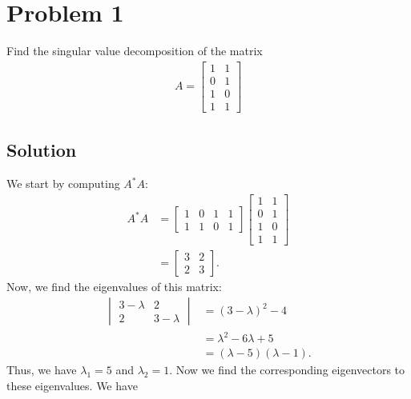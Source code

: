 \documentclass[10pt,a4paper]{article}
\author{Jeremiah Givens}
\theoremstyle{definition}
\begin{document}
\section*{Problem 1}
Find the singular value decomposition of the matrix
\begin{align*}
A = \begin{bmatrix}
1 & 1\\
0 & 1\\
1 & 0\\
1 & 1
\end{bmatrix}
\end{align*}

\subsection*{Solution}
We start by computing $A^*A$:
\begin{align*}
A^*A &= \begin{bmatrix}
1 & 0 & 1 & 1\\
1 & 1 & 0 & 1
\end{bmatrix} \begin{bmatrix}
1 & 1\\
0 & 1\\
1 & 0\\
1 & 1
\end{bmatrix}\\
&= \begin{bmatrix}
3 & 2\\
2 & 3
\end{bmatrix}.
\end{align*}
Now, we find the eigenvalues of this matrix:
\begin{align*}
\begin{vmatrix}
3 - \lambda & 2\\
2 & 3 - \lambda
\end{vmatrix} &= (3 - \lambda)^2 - 4\\
&= \lambda^2 - 6\lambda + 5\\
&= (\lambda - 5)(\lambda - 1).
\end{align*}
Thus, we have $\lambda_1 = 5$ and $\lambda_2 = 1$. Now we find the corresponding eigenvectors to these eigenvalues. We have
\end{document}
